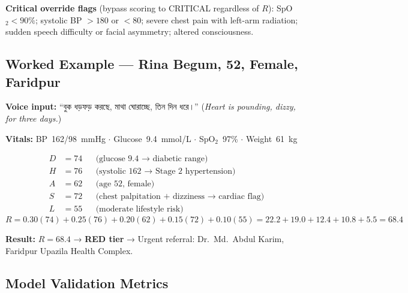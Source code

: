 \documentclass[12pt, a4paper]{article}
\newcommand{\bn}[1]{{\bengalifont #1}}
\begin{document}
\noindent\textbf{Critical override flags} (bypass scoring to CRITICAL regardless of $R$): SpO$_2 < 90\%$; systolic BP $>180$ or $<80$; severe chest pain with left-arm radiation; sudden speech difficulty or facial asymmetry; altered consciousness.

\subsection{Worked Example — Rina Begum, 52, Female, Faridpur}

\begin{researchbox}
\small
\textbf{Voice input:} \bn{``বুক ধড়ফড় করছে, মাথা ঘোরাচ্ছে, তিন দিন ধরে।''}
(\textit{Heart is pounding, dizzy, for three days.})

\medskip
\textbf{Vitals:} BP~162/98~mmHg $\cdot$ Glucose~9.4~mmol/L $\cdot$ SpO$_2$~97\% $\cdot$ Weight~61~kg

\medskip
\begin{align*}
D &= 74 && \text{(glucose 9.4 → diabetic range)}\\
H &= 76 && \text{(systolic 162 → Stage~2 hypertension)}\\
A &= 62 && \text{(age 52, female)}\\
S &= 72 && \text{(chest palpitation + dizziness → cardiac flag)}\\
L &= 55 && \text{(moderate lifestyle risk)}
\end{align*}
\[
R = 0.30(74) + 0.25(76) + 0.20(62) + 0.15(72) + 0.10(55)
  = 22.2 + 19.0 + 12.4 + 10.8 + 5.5 = \mathbf{68.4}
\]

\medskip
\textbf{Result:} $R = 68.4$ → \textcolor{riskred}{\textbf{RED tier}} → Urgent referral: Dr.\ Md.\ Abdul Karim, Faridpur Upazila Health Complex.
\end{researchbox}

\subsection{Model Validation Metrics}
\end{document}
